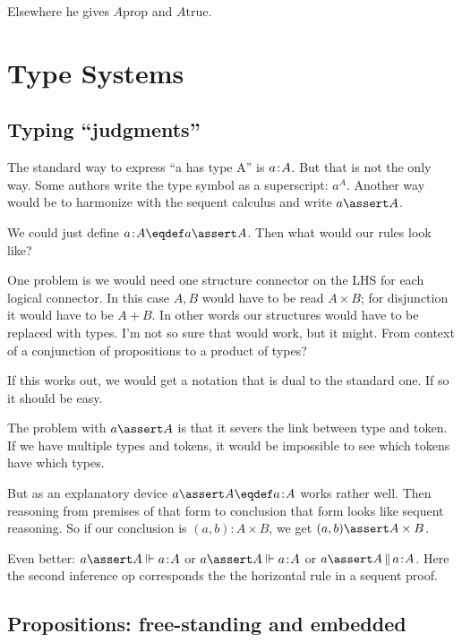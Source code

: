 \documentclass{article}
\begin{document}
Elsewhere he gives \(A \text{prop}\) and \(A \text{true}\).

\section{Type Systems}

\subsection{Typing ``judgments''}

The standard way to express ``a has type A'' is \(a\hspace{1pt}\mathpunct{:}\hspace{-1pt}A\). But that is
not the only way. Some authors write the type symbol as a superscript:
\(a^A\). Another way would be to harmonize with the sequent calculus
and write \(a\linfer A\).

We could just define \(\tj{a}{A}\eqdef a\linfer A\). Then what would our
rules look like?


One problem is we would need one structure connector on the LHS for
each logical connector. In this case \(A,B\) would have to be read
\(A\times B\); for disjunction it would have to be \(A\plus B\). In
other words our structures would have to be replaced with types. I'm
not so sure that would work, but it might. From context of a
conjunction of propositions to a product of types?


If this works out, we would get a notation that is dual to the
standard one. If so it should be easy.

The problem with \(a\linfer A\) is that it severs the link between type
and token. If we have multiple types and tokens, it would be
impossible to see which tokens have which types.

But as an explanatory device \(a\lso A\eqdef \tj{a}{A}\) works rather
well. Then reasoning from premises of that form to conclusion that
form looks like sequent reasoning. So if our conclusion is
\((a,b):A\times B\), we get \( (a,b)\lso A\times B\).

Even better: \(a\lso A\pso\tj{a}{A}\) or \(a\lso A\Vdash\tj{a}{A}\) or
\(a\lso A\,\Vert\,\tj{a}{A}\). Here the second inference op corresponds
the the horizontal rule in a sequent proof.

\subsection{Propositions: free-standing and embedded}
\end{document}
